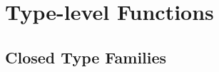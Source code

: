 \newcommand{\framedhslinecorrect}[2]%
  {#1[#2]}

\newcommand{\framedhs}{\sethscode{framedhscode}}


\newenvironment{inlinehscode}%
  {\(\def\column##1##2{}%
   \let\>\undefined\let\<\undefined\let\\\undefined
   \newcommand\>[1][]{}\newcommand\<[1][]{}\newcommand\\[1][]{}%
   \def\fromto##1##2##3{##3}%
   \def\nextline{}}{\) }%

\newcommand{\inlinehs}{\sethscode{inlinehscode}}


\newenvironment{joincode}%
  {\let\orighscode=\hscode
   \let\origendhscode=\endhscode
   \def\endhscode{\def\hscode{\endgroup\def\@currenvir{hscode}\\}\begingroup}
   \orighscode\def\hscode{\endgroup\def\@currenvir{hscode}}}%
  {\origendhscode
   \global\let\hscode=\orighscode
   \global\let\endhscode=\origendhscode}%

\makeatother
\EndFmtInput
%

%
\makeatletter

\let\Varid\mathit
\let\Conid\mathsf

\def\commentbegin{\quad\{\ }
\def\commentend{\}}

\newcommand{\ty}[1]{\Conid{#1}}
\newcommand{\con}[1]{\Conid{#1}}
\newcommand{\id}[1]{\Varid{#1}}
\newcommand{\cl}[1]{\Varid{#1}}
\newcommand{\opsym}[1]{\mathrel{#1}}

\newcommand\Keyword[1]{\textbf{\textsf{#1}}}
\newcommand\Hide{\mathbin{\downarrow}}
\newcommand\Reveal{\mathbin{\uparrow}}




\makeatother
\EndFmtInput

\section{Type-level Functions}
\label{sec:type-level-fun}

\subsection{Closed Type Families}

